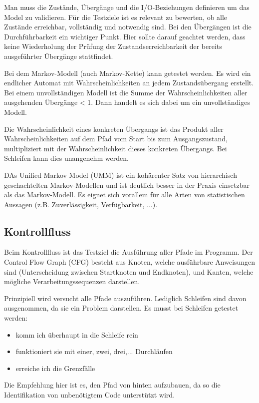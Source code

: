Man muss die Zustände, Übergänge und die I/O-Beziehungen definieren um das Model zu validieren. Für die Testziele ist es relevant zu bewerten, ob alle Zustände erreichbar, vollständig und notwendig sind. Bei den Übergängen ist die Durchführbarkeit  ein wichtiger Punkt. Hier sollte darauf geachtet werden, dass keine Wiederholung der Prüfung der Zustandserreichbarkeit der bereits ausgeführter Übergänge stattfindet. 

Bei dem Markov-Modell (auch Markov-Kette) kann getestet werden. Es wird ein endlicher Automat mit Wahrscheinlichkeiten an jedem Zustandsübergang erstellt. Bei einem unvollständigen Modell ist die Summe der Wahrscheinlichkeiten aller ausgehenden Übergänge < 1. Dann handelt es sich dabei um ein unvollständiges Modell.

Die Wahrscheinlichkeit eines konkreten Übergangs ist das Produkt aller Wahrscheinlichkeiten auf dem Pfad vom Start bis zum Ausgangszustand, multipliziert mit der Wahrscheinlichkeit dieses konkreten Übergangs. Bei Schleifen kann dies unangenehm werden.

DAs Unified Markov Model (UMM) ist ein kohärenter Satz von hierarchisch geschachtelten Markov-Modellen und ist deutlich besser in der Praxis einsetzbar als das Markov-Modell. Es eignet sich vorallem für alle Arten von statistischen Aussagen (z.B. Zuverlässigkeit, Verfügbarkeit, ...).

\subsection{Kontrollfluss}
Beim Kontrollfluss ist das Testziel die Ausführung aller Pfade im Programm. Der Control Flow Graph (CFG) besteht aus Knoten, welche ausführbare Anweisungen sind (Unterscheidung zwischen Startknoten und Endknoten), und Kanten, welche mögliche Verarbeitungssequenzen darstellen. 

Prinzipiell wird versucht alle Pfade auszuführen. Lediglich Schleifen sind davon ausgenommen, da sie ein Problem darstellen. Es musst bei Schleifen getestet werden:
\begin{itemize}
\item komm ich überhaupt in die Schleife rein
\item funktioniert sie mit einer, zwei, drei,... Durchläufen
\item erreiche ich die Grenzfälle
\end{itemize}

Die Empfehlung hier ist es, den Pfad von hinten aufzubauen, da so die Identifikation von unbenötigtem Code unterstützt wird.

